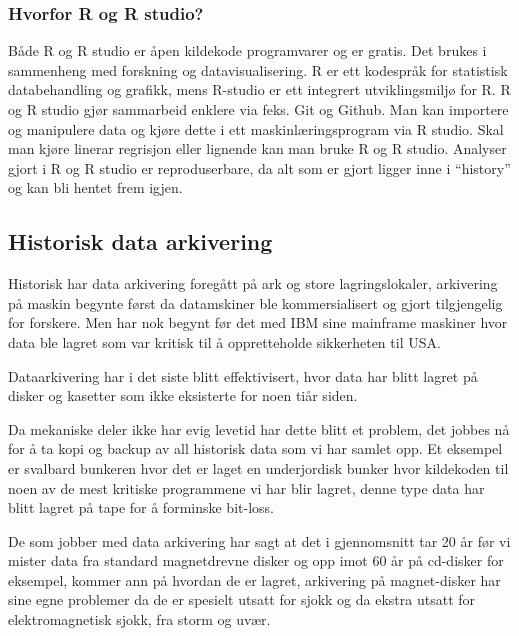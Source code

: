\documentclass[
  norsk,
]{article}
\begin{document}
\hypertarget{hvorfor-r-og-r-studio}{%
\subsubsection{\texorpdfstring{\textbf{Hvorfor R og R
studio?}}{Hvorfor R og R studio?}}\label{hvorfor-r-og-r-studio}}

Både R og R studio er åpen kildekode programvarer og er gratis. Det
brukes i sammenheng med forskning og datavisualisering. R er ett
kodespråk for statistisk databehandling og grafikk, mens R-studio er ett
integrert utviklingsmiljø for R. R og R studio gjør sammarbeid enklere
via feks. Git og Github. Man kan importere og manipulere data og kjøre
dette i ett maskinlæringsprogram via R studio. Skal man kjøre linerar
regrisjon eller lignende kan man bruke R og R studio. Analyser gjort i R
og R studio er reproduserbare, da alt som er gjort ligger inne i
``history'' og kan bli hentet frem igjen.

\hypertarget{historisk-data-arkivering}{%
\subsection{\texorpdfstring{\textbf{Historisk data
arkivering}}{Historisk data arkivering}}\label{historisk-data-arkivering}}

Historisk har data arkivering foregått på ark og store lagringslokaler,
arkivering på maskin begynte først da datamskiner ble kommersialisert og
gjort tilgjengelig for forskere. Men har nok begynt før det med IBM sine
mainframe maskiner hvor data ble lagret som var kritisk til å
oppretteholde sikkerheten til USA.

Dataarkivering har i det siste blitt effektivisert, hvor data har blitt
lagret på disker og kasetter som ikke eksisterte for noen tiår siden.

Da mekaniske deler ikke har evig levetid har dette blitt et problem, det
jobbes nå for å ta kopi og backup av all historisk data som vi har
samlet opp. Et eksempel er svalbard bunkeren hvor det er laget en
underjordisk bunker hvor kildekoden til noen av de mest kritiske
programmene vi har blir lagret, denne type data har blitt lagret på tape
for å forminske bit-loss.

De som jobber med data arkivering har sagt at det i gjennomsnitt tar 20
år før vi mister data fra standard magnetdrevne disker og opp imot 60 år
på cd-disker for eksempel, kommer ann på hvordan de er lagret,
arkivering på magnet-disker har sine egne problemer da de er spesielt
utsatt for sjokk og da ekstra utsatt for elektromagnetisk sjokk, fra
storm og uvær.
\end{document}
